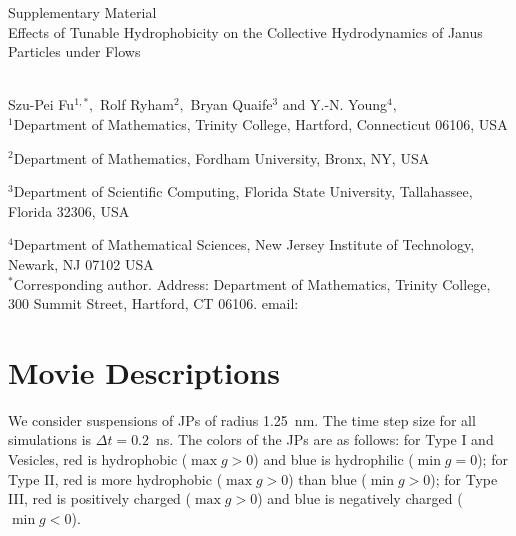 
\thispagestyle{empty}

\newpage
{\Large \bf

  \noindent Supplementary Material\\

  \noindent 
 Effects of Tunable Hydrophobicity on the Collective Hydrodynamics of Janus Particles under Flows}\\

\noindent 
Szu-Pei Fu$^{1,*},$ 
Rolf Ryham$^{2},$ 
Bryan Quaife$^{3}$ and Y.-N. Young$^{4},$
\\

\noindent
$^{1}$Department of Mathematics, Trinity College, Hartford, Connecticut 06106, USA

\noindent
$^{2}$Department of Mathematics, Fordham University, Bronx, NY, USA

\noindent
$^{3}$Department of Scientific Computing, Florida State University, Tallahassee, Florida 32306, USA

\noindent
$^{4}$Department of Mathematical Sciences, New Jersey Institute of Technology, Newark, NJ 07102 USA
\\

\noindent $^*$Corresponding author. Address: Department of Mathematics, Trinity College, 
300 Summit Street, Hartford, CT 06106. email: 



\setcounter{page}{1}

\setcounter{figure}{0}
\renewcommand{\thefigure}{S\arabic{figure}}

\setcounter{equation}{0}
\renewcommand{\theequation}{S\arabic{equation}}

\setcounter{section}{0}
\renewcommand{\thesection}{S\arabic{section}} 




\section{Movie Descriptions}
\label{sec:movie_description}
We consider suspensions of JPs of radius 1.25~nm. The time step size for
all simulations is $\Delta t = 0.2$~ns. The colors of the JPs are as
follows: for Type I and Vesicles, red is hydrophobic ($\max g > 0$) and
blue is hydrophilic ($\min g = 0$); for Type II, red is more hydrophobic
($\max g >0$) than blue ($\min g > 0$); for Type III, red is positively
charged ($\max g > 0$) and blue is negatively charged ($\min g < 0$).

